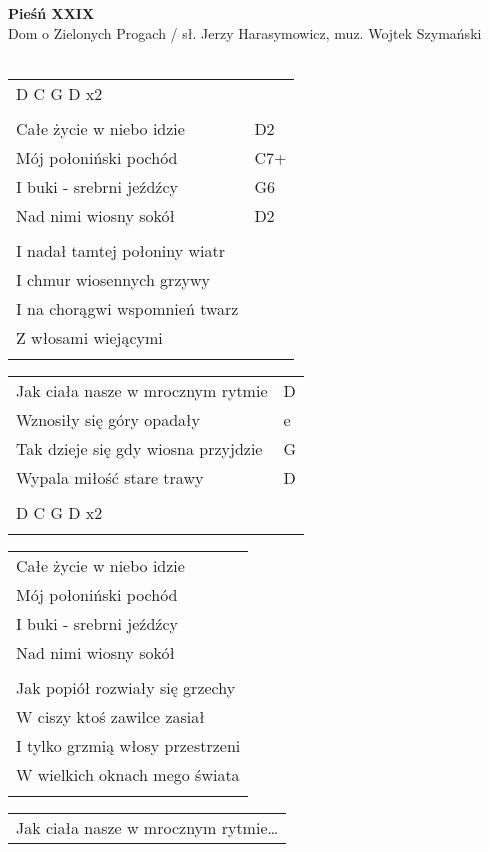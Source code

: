 \documentclass[a5paper]{article}
\begin{document}


\noindent
\fontsize{12pt}{15pt}\selectfont
\textbf{Pieśń XXIX} \\
\fontsize{8pt}{10pt}\selectfont
Dom o Zielonych Progach / sł. Jerzy Harasymowicz, muz. Wojtek Szymański \\ \\
\fontsize{10pt}{12pt}\selectfont
{}
\begin{tabular}{@{}p{8.00cm}p{3cm}@{}}
\noindent
D C G D x2 & \\ \\
Całe życie w niebo idzie & D2 \\
Mój połoniński pochód & C7+ \\
I buki - srebrni jeźdźcy & G6 \\
Nad nimi wiosny sokół & D2 \\ \\
I nadał tamtej połoniny wiatr & \\
I chmur wiosennych grzywy & \\
I na chorągwi wspomnień twarz & \\
Z włosami wiejącymi & \\ \\
\end{tabular}

\noindent
\begin{tabular}{@{}p{7.00cm}p{3cm}@{}}
Jak ciała nasze w mrocznym rytmie & D \\
Wznosiły się góry opadały & e \\
Tak dzieje się gdy wiosna przyjdzie & G \\
Wypala miłość stare trawy & D \\ \\
D C G D x2 & \\ \\
\end{tabular}

\noindent
\begin{tabular}{@{}p{8.00cm}@{}}
Całe życie w niebo idzie \\
Mój połoniński pochód \\
I buki - srebrni jeźdźcy \\
Nad nimi wiosny sokół \\ \\
Jak popiół rozwiały się grzechy \\
W ciszy ktoś zawilce zasiał \\
I tylko grzmią włosy przestrzeni \\
W wielkich oknach mego świata \\ \\
\end{tabular}

\noindent
\begin{tabular}{@{}p{7.00cm}@{}}
Jak ciała nasze w mrocznym rytmie…
\end{tabular}
\end{document}
